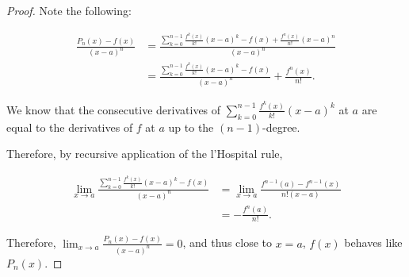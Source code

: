 \documentclass[11pt]{scrartcl}
\begin{document}
\begin{proof}
  \hfill

  Note the following:

  \begin{align}
    \frac{P_n(x)-f(x)}{(x-a)^n} &= \frac{\sum_{k=0}^{n-1} \frac{f^k(x)}{k!}(x-a)^k - f(x) +\frac{f^n(x)}{n!}(x-a)^n}{(x-a)^{n}}\\
                                &= \frac{\sum_{k=0}^{n-1} \frac{f^k(x)}{k!}(x-a)^k - f(x)}{(x-a)^{n}}  +\frac{f^n(x)}{n!}.
  \end{align}

  We know that the consecutive derivatives of $\sum_{k=0}^{n-1} \frac{f^k(x)}{k!}(x-a)^k$ at $a$ are equal to the derivatives of $f$ at $a$ up to the $(n-1)$-degree.

  Therefore, by recursive application of the l'Hospital rule,

  \begin{align}
    \lim_{x\to a}\frac{\sum_{k=0}^{n-1} \frac{f^k(x)}{k!}(x-a)^k - f(x)}{(x-a)^n} &= \lim_{x\to a} \frac{f^{n-1}(a) - f^{n-1}(x)}{n! (x-a)}\\
                                                                                  &= - \frac{f^n(a)}{n!}.
  \end{align}
  
  Therefore, $\lim_{x\to a}\frac{P_n(x)-f(x)}{(x-a)^n} = 0$, and thus close to $x = a$, $f(x)$ behaves like $P_n(x)$.
\end{proof}

\end{document}

